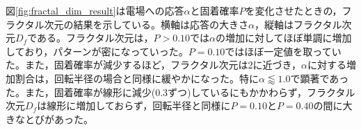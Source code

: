 \documentclass[autodetect-engine,dvi=dvipdfmx,a4paper,ja=standard,oneside,openany,11pt,draft]{bxjsbook}
\begin{document}
図\ref{fig:fractal_dim_result}は電場への応答$\alpha$と固着確率$P$を変化させたときの，フラクタル次元の結果を示している。横軸は応答の大きさ$\alpha$，縦軸はフラクタル次元$D_f$である。フラクタル次元は，$P>0.10$では$\alpha$の増加に対してほぼ単調に増加しており，パターンが密になっていった。$P=0.10$ではほぼ一定値を取っていた。また，固着確率が減少するほど，フラクタル次元は2に近づき，$\alpha$に対する増加割合は，回転半径の場合と同様に緩やかになった。特に$\alpha\lessapprox1.0$で顕著であった。また，固着確率が線形に減少(0.3ずつ)しているにもかかわらず，フラクタル次元$D_f$は線形に増加しておらず，回転半径と同様に$P=0.10$と$P=0.40$の間に大きなとびがあった。
\ifdraft{
  
  
}{}
\end{document}
